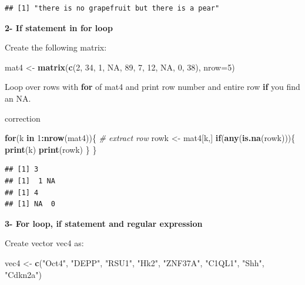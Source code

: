 \documentclass[]{book}
\newenvironment{Shaded}{\begin{snugshade}}{\end{snugshade}}
\newcommand{\CommentTok}[1]{\textcolor[rgb]{0.56,0.35,0.01}{\textit{#1}}}
\newcommand{\ControlFlowTok}[1]{\textcolor[rgb]{0.13,0.29,0.53}{\textbf{#1}}}
\newcommand{\DataTypeTok}[1]{\textcolor[rgb]{0.13,0.29,0.53}{#1}}
\newcommand{\DecValTok}[1]{\textcolor[rgb]{0.00,0.00,0.81}{#1}}
\newcommand{\KeywordTok}[1]{\textcolor[rgb]{0.13,0.29,0.53}{\textbf{#1}}}
\newcommand{\NormalTok}[1]{#1}
\newcommand{\OperatorTok}[1]{\textcolor[rgb]{0.81,0.36,0.00}{\textbf{#1}}}
\newcommand{\OtherTok}[1]{\textcolor[rgb]{0.56,0.35,0.01}{#1}}
\newcommand{\StringTok}[1]{\textcolor[rgb]{0.31,0.60,0.02}{#1}}
\begin{document}
\begin{verbatim}
## [1] "there is no grapefruit but there is a pear"
\end{verbatim}

\textbf{2- If statement in for loop}

Create the following matrix:

\begin{Shaded}
\begin{Highlighting}[]
\NormalTok{mat4 <-}\StringTok{ }\KeywordTok{matrix}\NormalTok{(}\KeywordTok{c}\NormalTok{(}\DecValTok{2}\NormalTok{, }\DecValTok{34}\NormalTok{, }\DecValTok{1}\NormalTok{, }\OtherTok{NA}\NormalTok{, }\DecValTok{89}\NormalTok{, }\DecValTok{7}\NormalTok{, }\DecValTok{12}\NormalTok{, }\OtherTok{NA}\NormalTok{, }\DecValTok{0}\NormalTok{, }\DecValTok{38}\NormalTok{),}
    \DataTypeTok{nrow=}\DecValTok{5}\NormalTok{)}
\end{Highlighting}
\end{Shaded}

Loop over rows with \textbf{for} of mat4 and print row number and entire row \textbf{if} you find an NA.

correction

\begin{Shaded}
\begin{Highlighting}[]
\ControlFlowTok{for}\NormalTok{(k }\ControlFlowTok{in} \DecValTok{1}\OperatorTok{:}\KeywordTok{nrow}\NormalTok{(mat4))\{}
    \CommentTok{# extract row}
\NormalTok{    rowk <-}\StringTok{ }\NormalTok{mat4[k,]}
    \ControlFlowTok{if}\NormalTok{(}\KeywordTok{any}\NormalTok{(}\KeywordTok{is.na}\NormalTok{(rowk)))\{}
        \KeywordTok{print}\NormalTok{(k)}
        \KeywordTok{print}\NormalTok{(rowk)}
\NormalTok{    \}}
\NormalTok{\}}
\end{Highlighting}
\end{Shaded}

\begin{verbatim}
## [1] 3
## [1]  1 NA
## [1] 4
## [1] NA  0
\end{verbatim}

\textbf{3- For loop, if statement and regular expression}

Create vector vec4 as:

\begin{Shaded}
\begin{Highlighting}[]
\NormalTok{vec4 <-}\StringTok{ }\KeywordTok{c}\NormalTok{(}\StringTok{"Oct4"}\NormalTok{, }\StringTok{"DEPP"}\NormalTok{, }\StringTok{"RSU1"}\NormalTok{, }\StringTok{"Hk2"}\NormalTok{, }\StringTok{"ZNF37A"}\NormalTok{, }\StringTok{"C1QL1"}\NormalTok{, }\StringTok{"Shh"}\NormalTok{, }\StringTok{"Cdkn2a"}\NormalTok{)}
\end{Highlighting}
\end{Shaded}
\end{document}
